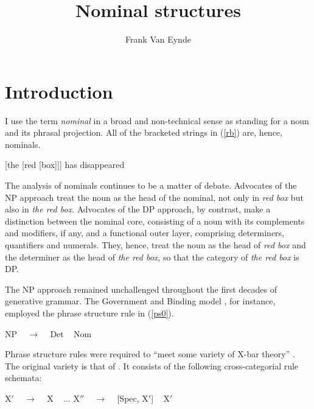 \documentclass[output=paper
	        ,collection
	        ,collectionchapter
 	        ,biblatex
                ,babelshorthands
                ,newtxmath
                ,draftmode
                ,colorlinks, citecolor=brown
]{langscibook}
\author{Frank {Van Eynde}\affiliation{University of Leuven}}
\title{Nominal structures}
\begin{document}
\maketitle
\label{chap-np}

\section{Introduction}


I use the term \emph{nominal} in a broad and non-technical sense as standing 
for a noun and its phrasal projection. 
All of the bracketed strings in (\ref{rb}) are, hence, nominals. 

\begin{exe} 
\ex\label{rb}  
{}[the [red [box]]] has disappeared
\end{exe} 
  
\noindent
The analysis of nominals continues to be a matter of debate. 
Advocates of the NP approach treat the noun as the head of the nominal, 
not only in \emph{red box} but also in \emph{the red box}. 
Advocates of the DP approach, by contrast, 
make a distinction between the nominal core, 
consisting of a noun with its complements and modifiers, if any,  
and a functional outer layer, comprising determiners, quantifiers and numerals. 
They, hence, treat the noun as the head of \emph{red box} and the determiner as
the head of \emph{the red box}, so that the category of \emph{the red box} is DP. 

The NP approach remained unchallenged throughout the first decades of generative 
grammar. The Government and Binding model \citep{Chomsky81}, for instance, 
employed the phrase structure rule in (\ref{ps0}). 

\begin{exe} 
\ex\label{ps0}     NP ~ $\rightarrow$ ~ Det ~ Nom
\end{exe}

\noindent
Phrase structure rules were required to ``meet some variety of X-bar theory'' \citep[5]{Chomsky81}. 
The original variety is that of \citet{Chomsky70}. It consists of the following
cross-categorial rule schemata:

\begin{exe} 
\ex\label{xbar} 
\begin{xlist} 
\ex\label{xbar1}   X$'$ ~ $\rightarrow$ ~ X ~  ... 
\ex\label{xbar2}   X$''$ ~ $\rightarrow$ ~ [Spec, X$'$] ~ X$'$ 
\end{xlist} 
\end{exe} 
\end{document}
